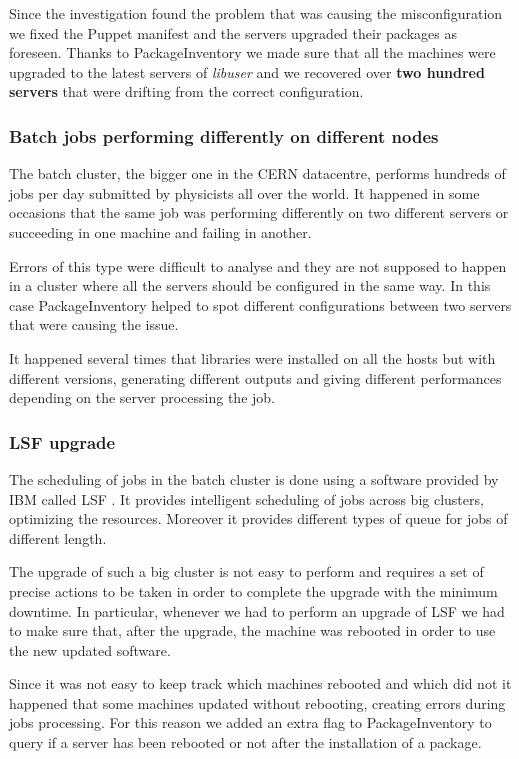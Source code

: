 Since the investigation found the problem that was causing the
misconfiguration we fixed the Puppet manifest and the servers upgraded
their packages as foreseen. Thanks to PackageInventory we made sure that
all the machines were upgraded to the latest servers of \textit{libuser} and
we recovered over \textbf{two hundred servers} that were drifting from the
correct configuration.

\subsubsection{Batch jobs performing differently on different nodes}

The batch cluster, the bigger one in the CERN datacentre, performs
hundreds of jobs per day submitted by physicists all over the world. It
happened in some occasions that the same job was performing differently
on two different servers or succeeding in one machine and failing in
another.

Errors of this type were difficult to analyse and they are not supposed to
happen in a cluster where all the servers should be configured in the same
way. In this case PackageInventory helped to spot different configurations
between two servers that were causing the issue.

It happened several times that libraries were installed on all the hosts but
with different versions, generating different outputs and giving different
performances depending on the server processing the job.

\subsubsection{LSF upgrade}

The scheduling of jobs in the batch cluster is done using a software
provided by IBM called LSF \cite{ibm-lsf}. It provides intelligent
scheduling of jobs across big clusters, optimizing the resources.
Moreover it provides different types of queue for jobs of different
length.

The upgrade of such a big cluster is not easy to perform and requires
a set of precise actions to be taken in order to complete the upgrade
with the minimum downtime. In particular, whenever we had to perform an
upgrade of LSF we had to make sure that, after the upgrade, the machine
was rebooted in order to use the new updated software.

Since it was not easy to keep track which machines rebooted and which
did not it happened that some machines updated without rebooting,
creating errors during jobs processing. For this reason we added an
extra flag to PackageInventory to query if a server has been rebooted or
not after the installation of a package.
